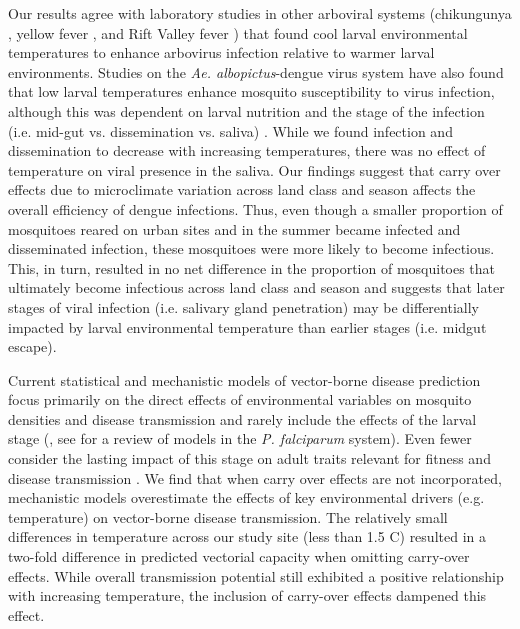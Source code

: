 \documentclass[12pt]{article}
\begin{document}

Our results agree with laboratory studies in other arboviral systems (chikungunya \citep{westbrook2010, adelman2013}, yellow fever \citep{adelman2013}, and Rift Valley fever \citep{turell1993}) that found cool larval environmental temperatures to enhance arbovirus infection relative to warmer larval environments. Studies on the \textit{Ae. albopictus}-dengue virus system have also found that low larval temperatures enhance mosquito susceptibility to virus infection, although this was dependent on larval nutrition \citep{buckner2016} and the stage of the infection (i.e. mid-gut vs. dissemination vs. saliva) \citep{alto2013}. While we found infection and dissemination to decrease with increasing temperatures, there was no effect of temperature on viral presence in the saliva. Our findings suggest that carry over effects due to microclimate variation across land class and season affects the overall efficiency of dengue infections. Thus, even though a smaller proportion of mosquitoes reared on urban sites and in the summer became infected and disseminated infection, these mosquitoes were more likely to become infectious. This, in turn, resulted in no net difference in the proportion of mosquitoes that ultimately become infectious across land class and season and suggests that later stages of viral infection (i.e. salivary gland penetration) may be differentially impacted by larval environmental temperature than earlier stages (i.e. midgut escape).

Current statistical and mechanistic models of vector-borne disease prediction focus primarily on the direct effects of environmental variables on mosquito densities and disease transmission and rarely include the effects of the larval stage (\citealt{mordecai2017}, see \citealt{reiner2015} for a review of models in the \textit{P. falciparum} system). Even fewer consider the lasting impact of this stage on adult traits relevant for fitness and disease transmission \citep{ezeakacha2015}. We find that when carry over effects are not incorporated, mechanistic models overestimate the effects of key environmental drivers (e.g. temperature) on vector-borne disease transmission. The relatively small differences in temperature across our study site (less than 1.5 \degree C) resulted in a two-fold difference in predicted vectorial capacity when omitting carry-over effects. While overall transmission potential still exhibited a positive relationship with increasing temperature, the inclusion of carry-over effects dampened this effect.
\end{document}
